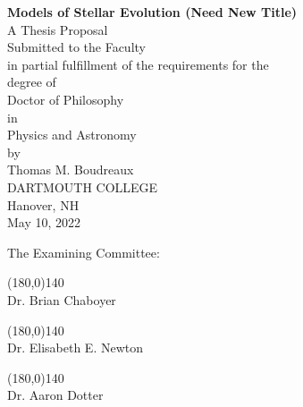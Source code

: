 \documentclass[11pt, manuscript]{aastex62}
\begin{document}
\begin{titlepage}
    \begin{center}
        \Large
        \vspace*{1cm}
		\textbf{Models of Stellar Evolution (Need New Title)} \\
        \vspace{0.75cm}
        \large
        A Thesis Proposal \\
        \vspace{0.25cm}
        Submitted to the Faculty \\
        in partial fulfillment of the requirements for the \\
        degree of \\
        \vspace{0.25cm}
        Doctor of Philosophy \\
        \vspace{0.25cm}
        in \\
        \vspace{0.25cm}
        Physics and Astronomy \\
        \vspace{0.5cm}
        by \\
        \vspace{0.25cm}
        Thomas M. Boudreaux \\
        \vspace{0.3cm}
        DARTMOUTH COLLEGE \\
        Hanover, NH \\
        May 10, 2022
     \end{center}
\vspace{1cm}
\begin{flushright}
The Examining Committee: \hspace{\parindent}
\vspace{0.4cm}
\end{flushright}
\begin{flushright}
\line(180,0){140}\\
        Dr. Brian Chaboyer
        \end{flushright}
        
        \begin{flushright}
        \line(180,0){140}\\
        Dr. Elisabeth E. Newton
        \end{flushright}
        
        \begin{flushright}
        \line(180,0){140}\\
        Dr. Aaron Dotter
        \end{flushright}

\end{titlepage}
\end{document}
